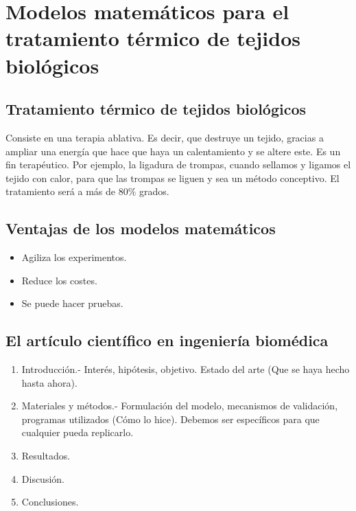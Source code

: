 \chapter{Modelos matemáticos para el tratamiento térmico de tejidos biológicos}

\section{Tratamiento térmico de tejidos biológicos}
Consiste en una terapia ablativa. Es decir, que destruye un tejido, gracias a ampliar una energía que hace que haya un calentamiento y se altere este. Es un fin terapéutico. Por ejemplo, la ligadura de trompas, cuando sellamos y ligamos el tejido con calor, para que las trompas se liguen y sea un método conceptivo. El tratamiento será a más de $80\%$ grados.

\section{Ventajas de los modelos matemáticos}
\begin{itemize}
    \item Agiliza los experimentos.
    \item Reduce los costes.
    \item Se puede hacer pruebas.
\end{itemize}

\section{El artículo científico en ingeniería biomédica}
\begin{enumerate}
    \item Introducción.- Interés, hipótesis, objetivo. Estado del arte (Que se haya hecho hasta ahora).
    \item Materiales y métodos.- Formulación del modelo, mecanismos de validación, programas utilizados (Cómo lo hice). Debemos ser específicos para que cualquier pueda replicarlo.
    \item Resultados. 
    \item Discusión.
    \item Conclusiones.
\end{enumerate}

